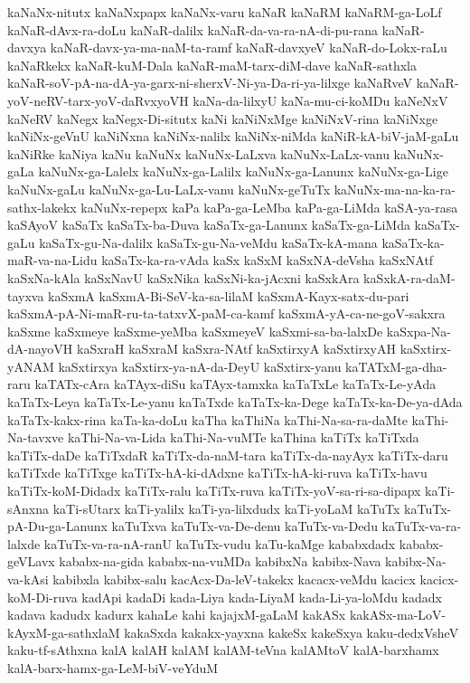 {kaNaNx-nitutx
kaNaNxpapx
kaNaNx-varu
kaNaR
kaNaRM
kaNaRM-ga-LoLf
kaNaR-dAvx-ra-doLu
kaNaR-dalilx
kaNaR-da-va-ra-nA-di-pu-rana
kaNaR-davxya
kaNaR-davx-ya-ma-naM-ta-ramf
kaNaR-davxyeV
kaNaR-do-Lokx-raLu
kaNaRkekx
kaNaR-kuM-Dala
kaNaR-maM-tarx-diM-dave
kaNaR-sathxla
kaNaR-soV-pA-na-dA-ya-garx-ni-sherxV-Ni-ya-Da-ri-ya-lilxge
kaNaRveV
kaNaR-yoV-neRV-tarx-yoV-daRvxyoVH
kaNa-da-lilxyU
kaNa-mu-ci-koMDu
kaNeNxV
kaNeRV
kaNegx
kaNegx-Di-situtx
kaNi
kaNiNxMge
kaNiNxV-rina
kaNiNxge
kaNiNx-geVnU
kaNiNxna
kaNiNx-nalilx
kaNiNx-niMda
kaNiR-kA-biV-jaM-gaLu
kaNiRke
kaNiya
kaNu
kaNuNx
kaNuNx-LaLxva
kaNuNx-LaLx-vanu
kaNuNx-gaLa
kaNuNx-ga-Lalelx
kaNuNx-ga-Lalilx
kaNuNx-ga-Lanunx
kaNuNx-ga-Lige
kaNuNx-gaLu
kaNuNx-ga-Lu-LaLx-vanu
kaNuNx-geTuTx
kaNuNx-ma-na-ka-ra-sathx-lakekx
kaNuNx-repepx
kaPa
kaPa-ga-LeMba
kaPa-ga-LiMda
kaSA-ya-rasa
kaSAyoV
kaSaTx
kaSaTx-ba-Duva
kaSaTx-ga-Lanunx
kaSaTx-ga-LiMda
kaSaTx-gaLu
kaSaTx-gu-Na-dalilx
kaSaTx-gu-Na-veMdu
kaSaTx-kA-mana
kaSaTx-ka-maR-va-na-Lidu
kaSaTx-ka-ra-vAda
kaSx
kaSxM
kaSxNA-deVsha
kaSxNAtf
kaSxNa-kAla
kaSxNavU
kaSxNika
kaSxNi-ka-jAcxni
kaSxkAra
kaSxkA-ra-daM-tayxva
kaSxmA
kaSxmA-Bi-SeV-ka-sa-lilaM
kaSxmA-Kayx-satx-du-pari
kaSxmA-pA-Ni-maR-ru-ta-tatxvX-paM-ca-kamf
kaSxmA-yA-ca-ne-goV-sakxra
kaSxme
kaSxmeye
kaSxme-yeMba
kaSxmeyeV
kaSxmi-sa-ba-lalxDe
kaSxpa-Na-dA-nayoVH
kaSxraH
kaSxraM
kaSxra-NAtf
kaSxtirxyA
kaSxtirxyAH
kaSxtirx-yANAM
kaSxtirxya
kaSxtirx-ya-nA-da-DeyU
kaSxtirx-yanu
kaTATxM-ga-dha-raru
kaTATx-cAra
kaTAyx-diSu
kaTAyx-tamxka
kaTaTxLe
kaTaTx-Le-yAda
kaTaTx-Leya
kaTaTx-Le-yanu
kaTaTxde
kaTaTx-ka-Dege
kaTaTx-ka-De-ya-dAda
kaTaTx-kakx-rina
kaTa-ka-doLu
kaTha
kaThiNa
kaThi-Na-sa-ra-daMte
kaThi-Na-tavxve
kaThi-Na-va-Lida
kaThi-Na-vuMTe
kaThina
kaTiTx
kaTiTxda
kaTiTx-daDe
kaTiTxdaR
kaTiTx-da-naM-tara
kaTiTx-da-nayAyx
kaTiTx-daru
kaTiTxde
kaTiTxge
kaTiTx-hA-ki-dAdxne
kaTiTx-hA-ki-ruva
kaTiTx-havu
kaTiTx-koM-Didadx
kaTiTx-ralu
kaTiTx-ruva
kaTiTx-yoV-sa-ri-sa-dipapx
kaTi-sAnxna
kaTi-sUtarx
kaTi-yalilx
kaTi-ya-lilxdudx
kaTi-yoLaM
kaTuTx
kaTuTx-pA-Du-ga-Lanunx
kaTuTxva
kaTuTx-va-De-denu
kaTuTx-va-Dedu
kaTuTx-va-ra-lalxde
kaTuTx-va-ra-nA-ranU
kaTuTx-vudu
kaTu-kaMge
kababxdadx
kababx-geVLavx
kababx-na-gida
kababx-na-vuMDa
kabibxNa
kabibx-Nava
kabibx-Na-va-kAsi
kabibxla
kabibx-salu
kacAcx-Da-leV-takekx
kacacx-veMdu
kacicx
kacicx-koM-Di-ruva
kadApi
kadaDi
kada-Liya
kada-LiyaM
kada-Li-ya-loMdu
kadadx
kadava
kadudx
kadurx
kahaLe
kahi
kajajxM-gaLaM
kakASx
kakASx-ma-LoV-kAyxM-ga-sathxlaM
kakaSxda
kakakx-yayxna
kakeSx
kakeSxya
kaku-dedxVsheV
kaku-tf-sAthxna
kalA
kalAH
kalAM
kalAM-teVna
kalAMtoV
kalA-barxhamx
kalA-barx-hamx-ga-LeM-biV-veYduM
}
